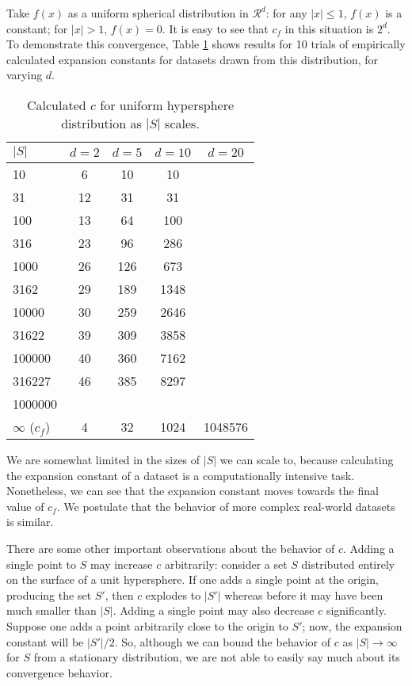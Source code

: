 Take $f(x)$ as a uniform spherical distribution in $\mathcal{R}^d$: for any $|x|
\le 1$, $f(x)$ is a constant; for $|x| > 1$, $f(x) = 0$.  It is easy to see that
$c_f$ in this situation is $2^d$.  To demonstrate this convergence, Table
\ref{tab:ec_scaling} shows results for 10 trials of empirically calculated
expansion constants for datasets drawn from this distribution, for varying $d$.

\begin{table}[htb]
\begin{center}
\begin{tabular}{|l|c|c|c|c|}
\hline
$|S|$ & $d = 2$ & $d = 5$ & $d = 10$ & $d = 20$ \\
\hline
10      & 6     & 10    & 10    &         \\
31      & 12    & 31    & 31    &         \\
100     & 13    & 64    & 100   &         \\
316     & 23    & 96    & 286   &         \\
1000    & 26    & 126   & 673   &         \\
3162    & 29    & 189   & 1348  &         \\
10000   & 30    & 259   & 2646  &         \\
31622   & 39    & 309   & 3858  &         \\
100000  & 40    & 360   & 7162  &         \\
316227  & 46    & 385   & 8297  &         \\
1000000 &       &       &       &         \\
$\infty$ ($c_f$)   & 4     & 32    & 1024  & 1048576 \\
\hline
\end{tabular}
\end{center}
\caption{Calculated $c$ for uniform hypersphere distribution as
$|S|$ scales.}
\label{tab:ec_scaling}
\end{table}

We are somewhat limited in the sizes of $|S|$ we can scale to, because
calculating the expansion constant of a dataset is a computationally intensive
task.  Nonetheless, we can see that the expansion constant moves towards the
final value of $c_f$.  We postulate that the behavior of more complex real-world
datasets is similar.

There are some other important observations about the behavior of $c$.  Adding a
single point to $S$ may increase $c$ arbitrarily: consider a set $S$ distributed
entirely on the surface of a unit hypersphere.  If one adds a single point at
the origin, producing the set $S'$, then $c$ explodes to $|S'|$ whereas before
it may have been much smaller than $|S|$.  Adding a single point may also
decrease $c$ significantly.  Suppose one adds a point arbitrarily close to the
origin to $S'$; now, the expansion constant will be $|S'| / 2$.  So, although we
can bound the behavior of $c$ as $|S| \to \infty$ for $S$ from a stationary
distribution, we are not able to easily say much about its convergence behavior.

